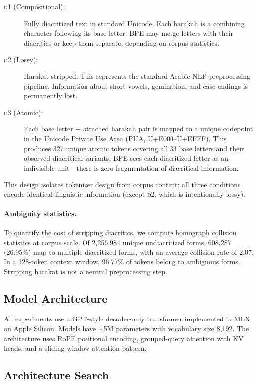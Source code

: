 \documentclass[11pt]{article}
\newcommand{\dOne}{\textsc{d1}}
\newcommand{\dTwo}{\textsc{d2}}
\newcommand{\dThree}{\textsc{d3}}
\begin{document}
\begin{description}
\item[\dOne{} (Compositional):] Fully diacritized text in standard Unicode.
Each harakah is a combining character following its base letter.
BPE may merge letters with their diacritics or keep them separate, depending on corpus statistics.

\item[\dTwo{} (Lossy):] Harakat stripped.
This represents the standard Arabic NLP preprocessing pipeline.
Information about short vowels, gemination, and case endings is permanently lost.

\item[\dThree{} (Atomic):] Each base letter + attached harakah pair is mapped to a unique codepoint in the Unicode Private Use Area (PUA, U+E000--U+EFFF).
This produces 327 unique atomic tokens covering all 33 base letters and their observed diacritical variants.
BPE sees each diacritized letter as an indivisible unit---there is zero fragmentation of diacritical information.
\end{description}

This design isolates tokenizer design from corpus content: all three conditions encode identical linguistic information (except \dTwo{}, which is intentionally lossy).

\paragraph{Ambiguity statistics.}
To quantify the cost of stripping diacritics, we compute homograph collision statistics at corpus scale.
Of 2,256,984 unique undiacritized forms, 608,287 (26.95\%) map to multiple diacritized forms, with an average collision rate of 2.07.
In a 128-token context window, 96.77\% of tokens belong to ambiguous forms.
Stripping harakat is not a neutral preprocessing step.

\subsection{Model Architecture}

All experiments use a GPT-style decoder-only transformer \cite{radford2019language} implemented in MLX \cite{mlx2023} on Apple Silicon.
Models have $\sim$5M parameters with vocabulary size 8,192.
The architecture uses RoPE positional encoding, grouped-query attention with KV heads, and a sliding-window attention pattern.

\subsection{Architecture Search}
\end{document}
